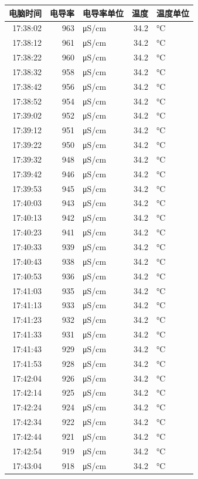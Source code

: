 \documentclass[11pt]{article}
\begin{document}
\begin{enumerate}
\begin{center}
\begin{tabular}{rrlrl}
电脑时间 & 电导率 & 电导率单位 & 温度 & 温度单位\\
\hline
17:38:02 & 963 & μS/cm & 34.2 & °C\\
17:38:12 & 961 & μS/cm & 34.2 & °C\\
17:38:22 & 960 & μS/cm & 34.2 & °C\\
17:38:32 & 958 & μS/cm & 34.2 & °C\\
17:38:42 & 956 & μS/cm & 34.2 & °C\\
17:38:52 & 954 & μS/cm & 34.2 & °C\\
17:39:02 & 952 & μS/cm & 34.2 & °C\\
17:39:12 & 951 & μS/cm & 34.2 & °C\\
17:39:22 & 950 & μS/cm & 34.2 & °C\\
17:39:32 & 948 & μS/cm & 34.2 & °C\\
17:39:42 & 946 & μS/cm & 34.2 & °C\\
17:39:53 & 945 & μS/cm & 34.2 & °C\\
17:40:03 & 943 & μS/cm & 34.2 & °C\\
17:40:13 & 942 & μS/cm & 34.2 & °C\\
17:40:23 & 941 & μS/cm & 34.2 & °C\\
17:40:33 & 939 & μS/cm & 34.2 & °C\\
17:40:43 & 938 & μS/cm & 34.2 & °C\\
17:40:53 & 936 & μS/cm & 34.2 & °C\\
17:41:03 & 935 & μS/cm & 34.2 & °C\\
17:41:13 & 933 & μS/cm & 34.2 & °C\\
17:41:23 & 932 & μS/cm & 34.2 & °C\\
17:41:33 & 931 & μS/cm & 34.2 & °C\\
17:41:43 & 929 & μS/cm & 34.2 & °C\\
17:41:53 & 928 & μS/cm & 34.2 & °C\\
17:42:04 & 926 & μS/cm & 34.2 & °C\\
17:42:14 & 925 & μS/cm & 34.2 & °C\\
17:42:24 & 924 & μS/cm & 34.2 & °C\\
17:42:34 & 922 & μS/cm & 34.2 & °C\\
17:42:44 & 921 & μS/cm & 34.2 & °C\\
17:42:54 & 919 & μS/cm & 34.2 & °C\\
17:43:04 & 918 & μS/cm & 34.2 & °C\\

\end{tabular}
\end{center}
\end{enumerate}
\end{document}

